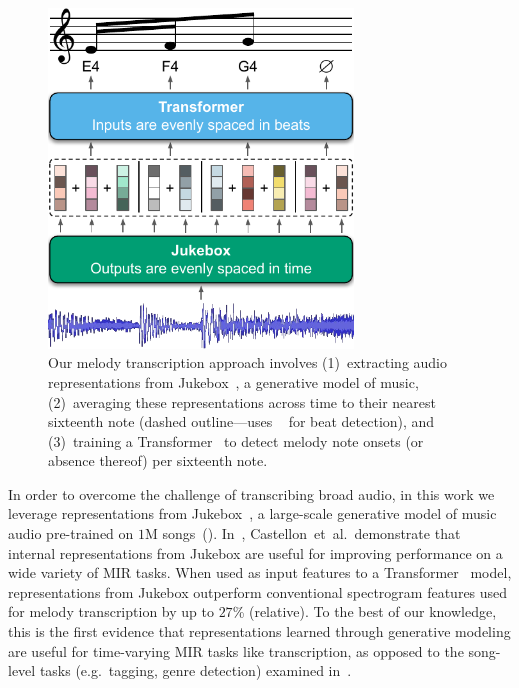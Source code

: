 \begin{figure}
    \centering
    \includegraphics[width=8.1cm]{figs/fig1.pdf}
    \caption{
Our melody transcription approach involves 
(1)~extracting audio representations from Jukebox~\cite{dhariwal2020jukebox}, a generative model of music, 
(2)~averaging these representations across time to their nearest sixteenth note (dashed outline---uses \madmom{}~\cite{bock2016joint,bock2016madmom} for beat detection),
and
(3)~training a Transformer~\cite{vaswani2017attention} to detect melody note onsets (or absence thereof) per sixteenth note. 
}
 \label{fig:fig1}
\end{figure}

In order to overcome the challenge of transcribing broad audio, in this work we leverage representations from Jukebox~\cite{dhariwal2020jukebox}, a large-scale generative model of music audio pre-trained on $1$M songs~(). 
In~\cite{castellon2021calm}, Castellon~et~al.\ demonstrate that internal representations from Jukebox are useful for improving performance on a wide variety of MIR tasks. 
When used as input features to a Transformer~\cite{vaswani2017attention} model, representations from Jukebox outperform conventional spectrogram features used for melody transcription by 
up to $27$\% (relative). 
To the best of our knowledge, this is the first evidence that representations learned through generative modeling are useful for time-varying MIR tasks like transcription, as opposed to the song-level tasks (e.g.~tagging, genre detection) examined in~\cite{castellon2021calm}.

